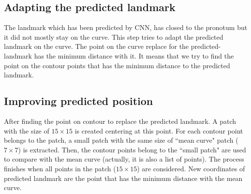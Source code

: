 \documentclass[12pt,a4paper]{article}
\begin{document}
\subsection*{Adapting the predicted landmark}
The landmark which has been predicted by CNN, has closed to the pronotum but it did not mostly stay on the curve. This step tries to adapt the predicted landmark on the curve. The point on the curve replace for the predicted-landmark has the minimum distance with it. It means that we try to find the point on the contour points that has the minimum distance to the predicted landmark.
\subsection*{Improving predicted position}
After finding the point on contour to replace the predicted landmark. A patch with the size of $15 \times 15$ is created centering at this point. For each contour point belongs to the patch, a small patch with the same size of ``mean curve" patch ($7 \times 7$) is extracted. Then, the contour points belong to the ``small patch" are used to compare with the mean curve (actually, it is also a list of points). The process finishes when all points in the patch ($15 \times 15$) are considered. New coordinates of predicted landmark are the point that has the minimum distance with the mean curve.
\end{document}
